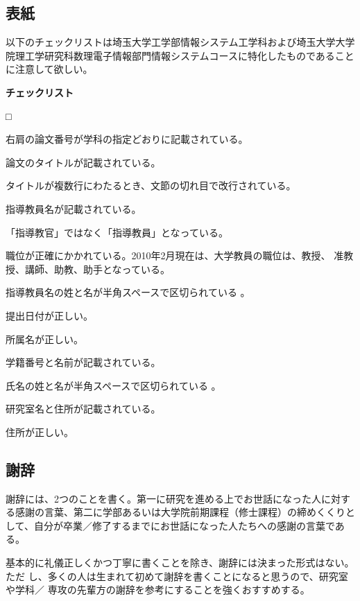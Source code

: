 \documentclass[11pt,a4j]{jsarticle}
\begin{document}
\subsection{表紙}

以下のチェックリストは埼玉大学工学部情報システム工学科および埼玉大学大学
院理工学研究科数理電子情報部門情報システムコースに特化したものであること
に注意して欲しい。

\begin{flushleft}
 {\bf チェックリスト}
\end{flushleft}
\begin{list}%
 {□} %
 {} %
 \item 右肩の論文番号が学科の指定どおりに記載されている。
 \item 論文のタイトルが記載されている。
 \item タイトルが複数行にわたるとき、文節の切れ目で改行されている。
 \item 指導教員名が記載されている。
 \item 「指導教官」ではなく「指導教員」となっている。
 \item 職位が正確にかかれている。2010年2月現在は、大学教員の職位は、教授、
       准教授、講師、助教、助手となっている。
 \item 指導教員名の姓と名が半角スペースで区切られている
       \cite{IPSJ_HowToWrite_ver7.1}。
 \item 提出日付が正しい。
 \item 所属名が正しい。
 \item 学籍番号と名前が記載されている。
 \item 氏名の姓と名が半角スペースで区切られている
       \cite{IPSJ_HowToWrite_ver7.1}。
 \item 研究室名と住所が記載されている。
 \item 住所が正しい。
\end{list}

\subsection{謝辞}

謝辞には、2つのことを書く。第一に研究を進める上でお世話になった人に対す
る感謝の言葉、第二に学部あるいは大学院前期課程（修士課程）の締めくくりと
して、自分が卒業／修了するまでにお世話になった人たちへの感謝の言葉である。

基本的に礼儀正しくかつ丁寧に書くことを除き、謝辞には決まった形式はない。ただ
し、多くの人は生まれて初めて謝辞を書くことになると思うので、研究室や学科／
専攻の先輩方の謝辞を参考にすることを強くおすすめする。
\end{document}
